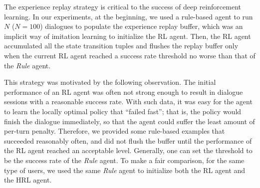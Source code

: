 \documentclass[11pt,letterpaper]{article}
\begin{document}
The experience replay strategy is critical to the success of deep reinforcement learning. In our experiments, at the beginning, we used a rule-based agent to run $N$ ($N=100$) dialogues to populate the experience replay buffer, which was an implicit way of imitation learning to initialize the RL agent. Then, the RL agent accumulated all the state transition tuples and flushes the replay buffer only when the current RL agent reached a success rate threshold no worse than that of the \textit{Rule} agent.

This strategy was motivated by the following observation. The initial performance of an RL agent was often not strong enough to result in dialogue sessions with a reasonable success rate.  With such data, it was easy for the agent to learn the locally optimal policy that ``failed fast''; that is, the policy would finish the dialogue immediately, so that the agent could suffer the least amount of per-turn penalty.  Therefore, we provided some rule-based examples that succeeded reasonably often, and did not flush the buffer until the performance of the RL agent reached an acceptable level. Generally, one can set the threshold to be the success rate of the \textit{Rule} agent. To make a fair comparison, for the same type of users, we used the same \textit{Rule} agent to initialize both the RL agent and the HRL agent.
\end{document}
